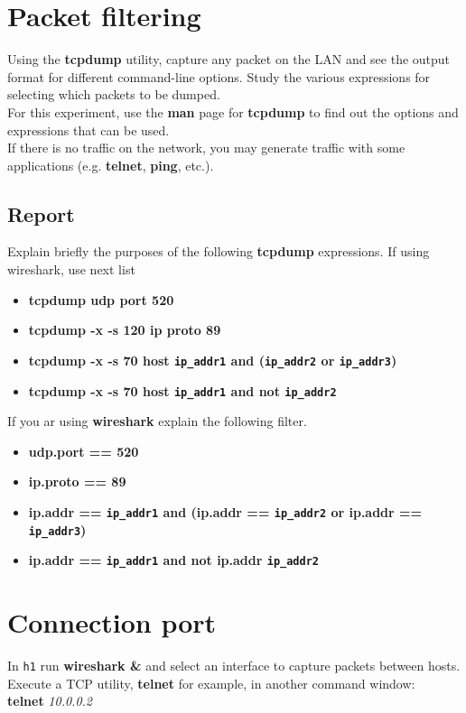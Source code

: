\documentclass[10pt,a4paper]{article}
\numberwithin{equation}{section}
\numberwithin{figure}{section}
\numberwithin{table}{section}
\begin{document}
    \section{Packet filtering}
    Using the \textbf{tcpdump} utility, capture any packet on the LAN and see the output format
for different command-line options. Study the various expressions for selecting
which packets to be dumped.\\
For this experiment, use the \textbf{man} page for \textbf{tcpdump} to find out the options and
expressions that can be used.\\
If there is no traffic on the network, you may generate traffic with some applications
(e.g. \textbf{telnet}, \textbf{ping}, etc.).\\
\subsection*{Report}
Explain briefly the purposes of the following \textbf{tcpdump} expressions. If using wireshark, use next list
\begin{itemize}
    \item \textbf{tcpdump udp port 520}
    \item \textbf{tcpdump -x -s 120 ip proto 89}
    \item \textbf{tcpdump -x -s 70 host \texttt{ip\_addr1} and (\texttt{ip\_addr2} or \texttt{ip\_addr3})}
    \item \textbf{tcpdump -x -s 70 host \texttt{ip\_addr1} and not \texttt{ip\_addr2}}
\end{itemize}
If you ar using \textbf{wireshark} explain the following filter.
\begin{itemize}
    \item \textbf{udp.port == 520}
    \item \textbf{ip.proto == 89}
    \item \textbf{ip.addr == \texttt{ip\_addr1} and (ip.addr == \texttt{ip\_addr2} or ip.addr == \texttt{ip\_addr3})}
    \item \textbf{ip.addr == \texttt{ip\_addr1} and not ip.addr \texttt{ip\_addr2}}
\end{itemize}

\section{Connection port}
    In \texttt{h1} run \textbf{wireshark \&} and select an interface to capture packets between hosts. \\
    Execute a TCP utility, \textbf{telnet} for example, in another command window: \\
    \textbf{telnet} \textit{10.0.0.2}
\end{document}
